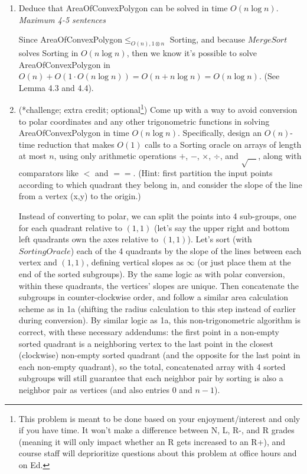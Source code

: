 \documentclass[11pt]{article}
\begin{document}
\begin{enumerate}
\begin{enumerate}
        \item Deduce that AreaOfConvexPolygon can be solved in time $O(n\log n)$. \textit{Maximum 4-5 sentences}

        \begin{mysolution}
        	Since AreaOfConvexPolygon$\leq_{O(n),1\otimes n}$ Sorting, and because $MergeSort$ solves Sorting in $O(n \log n)$, then we know it's possible to solve AreaOfConvexPolygon in $O(n)+O(1\cdot O(n \log n))=O(n+n \log n)=O(n \log n)$. (See Lemma 4.3 and 4.4).
        \end{mysolution}


        \item (*challenge; extra credit; optional\footnote{This problem is meant to be done based on your enjoyment/interest and only if you have time. It won't make a difference between N, L, R-, and R grades (meaning it will only impact whether an R gets increased to an R+), and course staff will deprioritize questions about this problem at office hours and on Ed.})  Come up with a way to avoid conversion to polar coordinates and any other trigonometric functions in solving AreaOfConvexPolygon in time $O(n\log n)$.  Specifically, design an $O(n)$-time reduction that makes $O(1)$ calls to a Sorting oracle on arrays of length at most $n$, using only arithmetic operations $+$, $-$, $\times$, $\div$, and $\sqrt{\hspace{1em}}$, along with comparators like $<$ and $==$.  (Hint: first partition the input points according to which quadrant they belong in, and consider the slope of the line from a vertex (x,y) to the origin.) \label{part:nopolar}

    \begin{mysolution}
    	\qquad Instead of converting to polar, we can split the points into 4 sub-groups, one for each quadrant relative to $(1,1)$ (let's say the upper right and bottom left quadrants own the axes relative to $(1,1)$). Let's sort (with $SortingOracle$) each of the 4 quadrants by the slope of the lines between each vertex and $(1,1)$, defining vertical slopes as $\infty$ (or just place them at the end of the sorted subgroups). By the same logic as with polar conversion, within these quadrants, the vertices' slopes are unique. Then concatenate the subgroups in counter-clockwise order, and follow a similar area calculation scheme as in 1a (shifting the radius calculation to this step instead of earlier during conversion). By similar logic as 1a, this non-trigonometric algorithm is correct, with these necessary addendums: the first point in a non-empty sorted quadrant is a neighboring vertex to the last point in the closest (clockwise) non-empty sorted quadrant (and the opposite for the last point in each non-empty quadrant), so the total, concatenated array with 4 sorted subgroups will still guarantee that each neighbor pair by sorting is also a neighbor pair as vertices (and also entries 0 and $n-1$).
    	

\end{mysolution}
\end{enumerate}
\end{enumerate}
\end{document}
